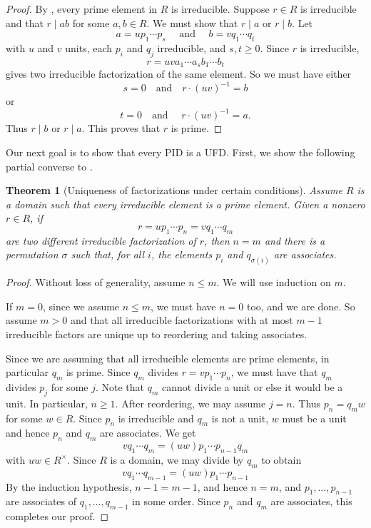 \documentclass[12pt]{report}
\newtheorem{theorem}{Theorem}[chapter]
\numberwithin{equation}{section}
\numberwithin{theorem}{chapter}
\theoremstyle{definition}
\newtheorem*{basic properties}{Basic Properties}
\newtheorem*{Important Remark}{Important Remark}
\begin{document}
\begin{proof}
By , every prime element in $R$ is irreducible. Suppose $r \in R$ is irreducible and that $r \mid a b$ for some $a, b \in R$. We must show that $r \mid a$ or $r \mid b$. Let 
$$a = u p_1 \cdots p_s \quad \text{ and } \quad b = v q_1 \cdots q_t$$ 
with $u$ and $v$ units, each $p_i$ and $q_j$ irreducible, and $s,t \geqslant 0$. 
Since $r$ is irreducible, 
$$r= uv a_1 \cdots a_s b_1 \cdots b_t$$ 
gives two irreducible factorization of the same element. So we must have either 
$$s=0 \quad \text{and} \quad r \cdot (uv)^{-1} = b$$ 
or 
$$t=0 \quad \text{and } \quad r \cdot (uv)^{-1} = a.$$ 
Thus $r \mid b$ or $r \mid a$. This proves that $r$ is prime.
\end{proof}



Our next goal is to show that every PID is a UFD. First, we show the following partial converse to .




\begin{theorem}[Uniqueness of factorizations under certain conditions]\label{uniqueness factorization under certain conditions}
Assume $R$ is a domain such that every irreducible element is a prime element.
Given a nonzero $r \in R$, if 
$$r = up_1 \cdots p_n = vq_1 \cdots q_m$$ 
are two different irreducible factorization of $r$, then $n=m$ and there is a permutation $\sigma$ such that, for all $i$, the elements $p_i$ and $q_{\sigma(i)}$ are associates.  	
\end{theorem}

 
\begin{proof}
Without loss of generality, assume $n \leqslant m$. We will use induction on $m$.

If $m = 0$, since we assume $n \leqslant m$, we must have $n = 0$ too, and we are done. So assume $m > 0$ and that all irreducible factorizations with at most $m-1$ irreducible factors are unique up to reordering and taking associates.

Since we are assuming that all irreducible elements are prime elements, in particular $q_m$ is prime. Since $q_m$ divides $r = vp_1 \cdots p_n$, we must have that $q_m$ divides $p_j$ for some $j$. Note that $q_m$ cannot divide a unit or else it would be a unit. In particular, $n \geqslant 1$. After reordering, we may assume $j = n$. Thus $p_n = q_m w$ for some $w \in R$. Since $p_n$ is irreducible and $q_m$ is not a unit, $w$ must be a unit and hence $p_n$ and $q_m$ are associates.  We get
$$vq_1 \cdots q_m = (uw)p_1 \cdots p_{n-1} q_m$$
with $uw \in R^\times$. Since $R$ is a domain, we may divide by $q_m$ to obtain
$$vq_1 \cdots q_{m-1} = (uw)p_1 \cdots p_{n-1}$$
By the induction hypothesis, $n-1=m-1$, and hence $n=m$, and $p_1, \ldots, p_{n-1}$ are associates of $q_1, \ldots,  q_{m-1}$ in some order. Since $p_n$ and $q_m$ are associates, this completes our proof.
\end{proof}
\end{document}
